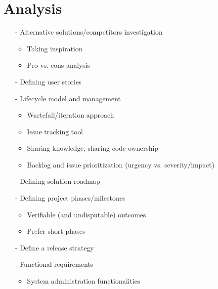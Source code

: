 \documentclass[
	fontsize=10pt, %
	twoside=false, %
	secnumdepth=1, %
]{kaobook}
\begin{document}
\chapter{Analysis}
	\begin{itemize}
		\item[-] Alternative solutions/competitors investigation
			\begin{itemize}
				\item Taking inspiration
				\item Pro vs. cons analysis
			\end{itemize}
		\item[-] Defining user stories
		\item[-] Lifecycle model and management
			\begin{itemize}
				\item Wartefall/iteration approach
				\item Issue tracking tool
				\item Sharing knowledge, sharing code ownership
				\item Backlog and issue prioritization (urgency vs. severity/impact)
			\end{itemize}
		\item[-] Defining solution roadmap
		\item[-] Defining project phases/milestones
			\begin{itemize}
				\item Verifiable (and undisputable) outcomes
				\item Prefer short phases
			\end{itemize}
		\item[-] Define a release strategy
		\item[-] Functional requirements
			\begin{itemize}
				\item System administration functionalities
			\end{itemize}


\end{itemize}
\end{document}
